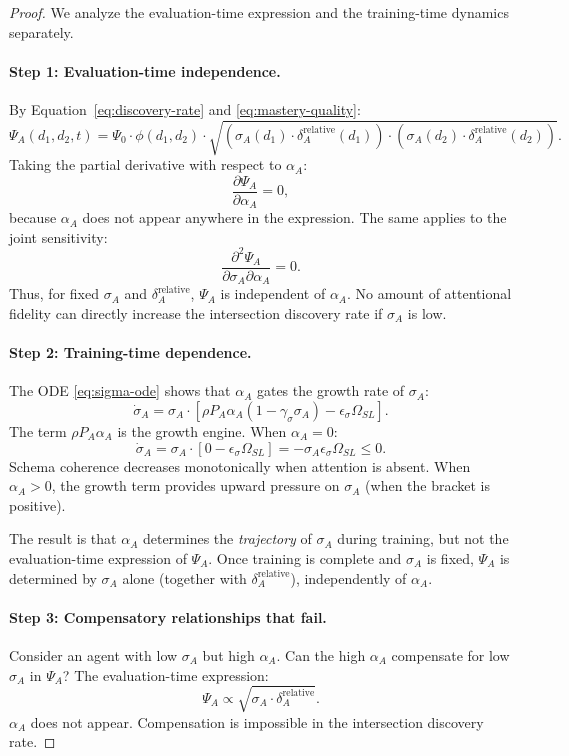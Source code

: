 \begin{proof}
We analyze the evaluation-time expression and the training-time
dynamics separately.

\paragraph{Step 1: Evaluation-time independence.}
By Equation~\eqref{eq:discovery-rate} and
\eqref{eq:mastery-quality}:
\[
\Psi_A(d_1, d_2, t) = \Psi_0 \cdot \phi(d_1, d_2) \cdot
\sqrt{(\sigma_A(d_1) \cdot \delta_A^{\text{relative}}(d_1))
\cdot (\sigma_A(d_2) \cdot \delta_A^{\text{relative}}(d_2))}.
\]
Taking the partial derivative with respect to $\alpha_A$:
\[
\frac{\partial \Psi_A}{\partial \alpha_A} = 0,
\]
because $\alpha_A$ does not appear anywhere in the expression.
The same applies to the joint sensitivity:
\[
\frac{\partial^2 \Psi_A}{\partial \sigma_A \partial \alpha_A} = 0.
\]
Thus, for fixed $\sigma_A$ and $\delta_A^{\text{relative}}$, $\Psi_A$
is independent of $\alpha_A$. No amount of attentional fidelity can
directly increase the intersection discovery rate if $\sigma_A$ is low.

\paragraph{Step 2: Training-time dependence.}
The ODE \eqref{eq:sigma-ode} shows that $\alpha_A$ gates the growth
rate of $\sigma_A$:
\[
\dot{\sigma}_A = \sigma_A \cdot
[\rho P_A \alpha_A (1 - \gamma_\sigma \sigma_A) - \epsilon_\sigma \Omega_{SL}].
\]
The term $\rho P_A \alpha_A$ is the growth engine. When $\alpha_A = 0$:
\[
\dot{\sigma}_A = \sigma_A \cdot [0 - \epsilon_\sigma \Omega_{SL}]
= -\sigma_A \epsilon_\sigma \Omega_{SL} \leq 0.
\]
Schema coherence decreases monotonically when attention is absent.
When $\alpha_A > 0$, the growth term provides upward pressure on
$\sigma_A$ (when the bracket is positive).

The result is that $\alpha_A$ determines the \emph{trajectory} of
$\sigma_A$ during training, but not the evaluation-time expression
of $\Psi_A$. Once training is complete and $\sigma_A$ is fixed,
$\Psi_A$ is determined by $\sigma_A$ alone (together with
$\delta_A^{\text{relative}}$), independently of $\alpha_A$.

\paragraph{Step 3: Compensatory relationships that fail.}
Consider an agent with low $\sigma_A$ but high $\alpha_A$. Can the
high $\alpha_A$ compensate for low $\sigma_A$ in $\Psi_A$? The
evaluation-time expression:
\[
\Psi_A \propto \sqrt{\sigma_A \cdot \delta_A^{\text{relative}}}.
\]
$\alpha_A$ does not appear. Compensation is impossible in the
intersection discovery rate.


\end{proof}
